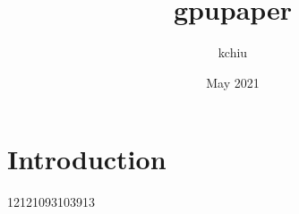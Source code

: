 \documentclass[conference]{IEEEtran}
\title{gpupaper}
\author{kchiu }
\date{May 2021}
\begin{document}
\maketitle
\section{Introduction}
12121093103913
\end{document}
